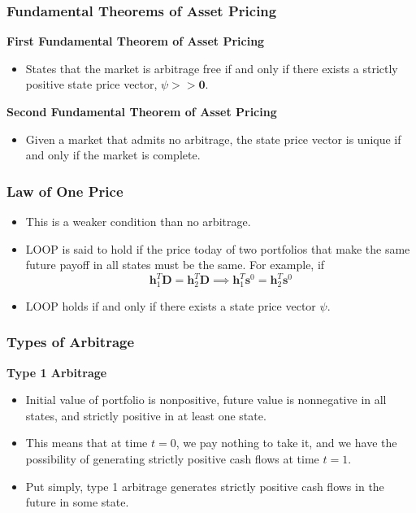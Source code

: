 \documentclass[11pt]{article}
\begin{document}
\subsubsection{Fundamental Theorems of Asset Pricing}
\textbf{First Fundamental Theorem of Asset Pricing}
\begin{itemize}
    \item States that the market is arbitrage free if and only if there exists a strictly 
    positive state price vector, $\psi >> \boldsymbol{0}$.
\end{itemize}

\textbf{Second Fundamental Theorem of Asset Pricing}
\begin{itemize}
    \item Given a market that admits no arbitrage, the state price vector is unique if and only 
    if the market is complete. 
\end{itemize}

\subsubsection{Law of One Price}
\begin{itemize}
    \item This is a weaker condition than no arbitrage.
    \item LOOP is said to hold if the price today of two portfolios that make the same future
    payoff in all states must be the same. For example, if 
    \[\boldsymbol{h}_1^T \boldsymbol{D} = \boldsymbol{h}_2^T \boldsymbol{D} \implies
    \boldsymbol{h}_1^T \boldsymbol{s}^0 = \boldsymbol{h}_2^T \boldsymbol{s}^0 \]
    \item LOOP holds if and only if there exists a state price vector $\psi$.
\end{itemize}

\subsubsection{Types of Arbitrage}
\textbf{Type 1 Arbitrage}
\begin{itemize}
    \item Initial value of portfolio is nonpositive, future value is nonnegative in all 
    states, and strictly positive in at least one state. 
    \item This means that at time $t=0$, we pay nothing to take it, and we have the possibility 
    of generating strictly positive cash flows at time $t=1$.
    \item Put simply, type 1 arbitrage generates strictly positive cash flows in the future in 
    some state. 
\end{itemize}
\end{document}
